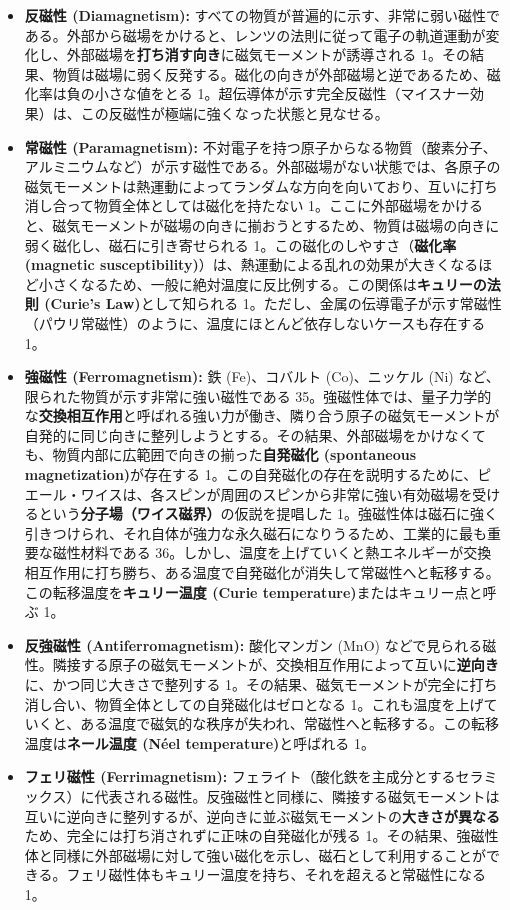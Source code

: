 \documentclass[11pt,a4paper]{ltjsarticle}
\begin{document}
\begin{itemize}
\item \textbf{反磁性 (Diamagnetism):} すべての物質が普遍的に示す、非常に弱い磁性である。外部から磁場をかけると、レンツの法則に従って電子の軌道運動が変化し、外部磁場を\textbf{打ち消す向き}に磁気モーメントが誘導される 1。その結果、物質は磁場に弱く反発する。磁化の向きが外部磁場と逆であるため、磁化率は負の小さな値をとる 1。超伝導体が示す完全反磁性（マイスナー効果）は、この反磁性が極端に強くなった状態と見なせる。

\item \textbf{常磁性 (Paramagnetism):} 不対電子を持つ原子からなる物質（酸素分子、アルミニウムなど）が示す磁性である。外部磁場がない状態では、各原子の磁気モーメントは熱運動によってランダムな方向を向いており、互いに打ち消し合って物質全体としては磁化を持たない 1。ここに外部磁場をかけると、磁気モーメントが磁場の向きに揃おうとするため、物質は磁場の向きに弱く磁化し、磁石に引き寄せられる 1。この磁化のしやすさ（\textbf{磁化率 (magnetic susceptibility)}）は、熱運動による乱れの効果が大きくなるほど小さくなるため、一般に絶対温度に反比例する。この関係は\textbf{キュリーの法則 (Curie's Law)}として知られる 1。ただし、金属の伝導電子が示す常磁性（パウリ常磁性）のように、温度にほとんど依存しないケースも存在する 1。

\item \textbf{強磁性 (Ferromagnetism):} 鉄 (Fe)、コバルト (Co)、ニッケル (Ni) など、限られた物質が示す非常に強い磁性である 35。強磁性体では、量子力学的な\textbf{交換相互作用}と呼ばれる強い力が働き、隣り合う原子の磁気モーメントが自発的に同じ向きに整列しようとする。その結果、外部磁場をかけなくても、物質内部に広範囲で向きの揃った\textbf{自発磁化 (spontaneous magnetization)}が存在する 1。この自発磁化の存在を説明するために、ピエール・ワイスは、各スピンが周囲のスピンから非常に強い有効磁場を受けるという\textbf{分子場（ワイス磁界）}の仮説を提唱した 1。強磁性体は磁石に強く引きつけられ、それ自体が強力な永久磁石になりうるため、工業的に最も重要な磁性材料である 36。しかし、温度を上げていくと熱エネルギーが交換相互作用に打ち勝ち、ある温度で自発磁化が消失して常磁性へと転移する。この転移温度を\textbf{キュリー温度 (Curie temperature)}またはキュリー点と呼ぶ 1。

\item \textbf{反強磁性 (Antiferromagnetism):} 酸化マンガン (MnO) などで見られる磁性。隣接する原子の磁気モーメントが、交換相互作用によって互いに\textbf{逆向き}に、かつ同じ大きさで整列する 1。その結果、磁気モーメントが完全に打ち消し合い、物質全体としての自発磁化はゼロとなる 1。これも温度を上げていくと、ある温度で磁気的な秩序が失われ、常磁性へと転移する。この転移温度は\textbf{ネール温度 (Néel temperature)}と呼ばれる 1。

\item \textbf{フェリ磁性 (Ferrimagnetism):} フェライト（酸化鉄を主成分とするセラミックス）に代表される磁性。反強磁性と同様に、隣接する磁気モーメントは互いに逆向きに整列するが、逆向きに並ぶ磁気モーメントの\textbf{大きさが異なる}ため、完全には打ち消されずに正味の自発磁化が残る 1。その結果、強磁性体と同様に外部磁場に対して強い磁化を示し、磁石として利用することができる。フェリ磁性体もキュリー温度を持ち、それを超えると常磁性になる 1。
\end{itemize}
\end{document}
